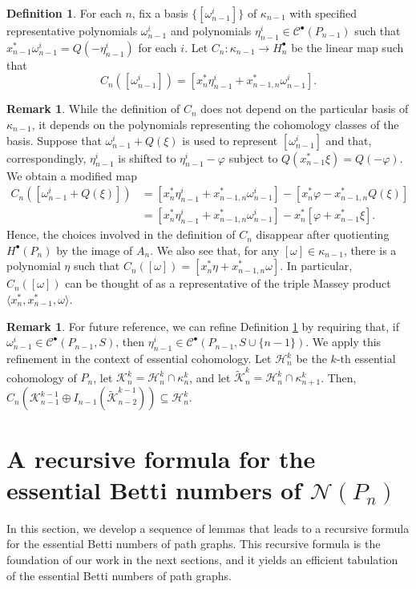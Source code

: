 \documentclass[12pt]{amsart}
\theoremstyle{definition}
\newtheorem{rem}[theorem]{Remark}
\newtheorem{mydef}[theorem]{Definition}
\begin{document}
\begin{mydef}\label{def:10}
For each $n$, fix a basis $\{[\omega^i_{n-1}]\}$ of $\kappa_{n-1}$ with specified representative polynomials $\omega^i_{n-1}$ and polynomials $\eta^i_{n-1}\in \mathcal C^\bullet(P_{n-1})$ such that $x_{n-1}^*\omega_{n-1}^i=Q(-\eta_{n-1}^i)$ for each $i$. Let $C_n \colon \kappa_{n-1}\to H^\bullet_n$ be the linear map such that
\[
C_n([\omega^i_{n-1}])=[x_n^*\eta^i_{n-1}+x_{n-1,n}^* \omega^i_{n-1}].
\]
\end{mydef}

\begin{rem}\label{rem:12}
While the definition of $C_n$ does not depend on the particular basis of $\kappa_{n-1}$, it depends on the polynomials representing the cohomology classes of the basis. Suppose that $\omega^i_{n-1}+Q(\xi)$ is used to represent $[\omega_{n-1}^i]$ and that, correspondingly, $\eta_{n-1}^i$ is shifted to $\eta_{n-1}^i-\varphi$ subject to $Q(x_{n-1}^*\xi)=Q(-\varphi)$. We obtain a modified map 
\begin{align*}
C_n([\omega^i_{n-1}+Q(\xi)])& =[x_n^*\eta^i_{n-1}+x_{n-1,n}^* \omega^i_{n-1}]-[x_n^*\varphi-x_{n-1,n}^*Q(\xi)]\\
&=[x_n^*\eta^i_{n-1}+x_{n-1,n}^* \omega^i_{n-1}]-x_n^*[\varphi+x_{n-1}^*\xi].
\end{align*}
Hence, the choices involved in the definition of $C_n$ disappear after quotienting $H^\bullet(P_n)$ by the image of $A_n$. We also see that, for any $[\omega]\in \kappa_{n-1}$, there is a polynomial $\eta$ such that $C_n([\omega])=[x_n^*\eta+x_{n-1,n}^* \omega]$.
In particular, $C_n([\omega])$ can be thought of as a representative of the triple Massey product $\langle x_n^*,x_{n-1}^*,\omega\rangle$.
\end{rem}

\begin{rem}\label{rem:12bis}
For future reference, we can refine Definition \ref{def:10} by requiring that, if $\omega_{n-1}^i\in \mathcal C^\bullet(P_{n-1},S)$, then $\eta_{n-1}^i\in \mathcal C^\bullet(P_{n-1},S\cup\{n-1\})$. We apply this refinement in the context of essential cohomology. Let $\mathcal H_n^k$ be the $k$-th essential cohomology of $P_n$,
let $\mathcal K_n^k=\mathcal H_n^k\cap \kappa_n^k$, and let  $\widetilde{ \mathcal K}_n^k=\mathcal H_n^k\cap \kappa_{n+1}^k$. Then, $C_n (\mathcal K_{n-1}^{k-1}\oplus I_{n-1}( \widetilde{\mathcal K}_{n-2}^{k-1}))\subseteq \mathcal H_n^k$.
\end{rem}

\section{A recursive formula for the essential Betti numbers of $\mathcal N(P_n)$}\label{sec:3}
In this section, we develop a sequence of lemmas that leads to a recursive formula for the essential Betti numbers of path graphs. This recursive formula is the foundation of our work in the next sections, and it yields an efficient tabulation of the essential Betti numbers of path graphs.
\end{document}
